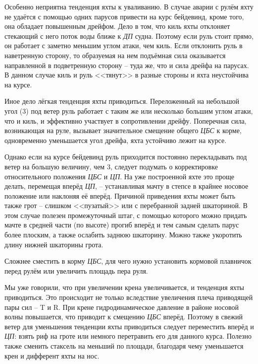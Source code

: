 Особенно неприятна тенденция яхты к уваливанию. В случае аварии с
рулём яхту не удаётся с помощью одних парусов привести на курс
бейдевинд, кроме того, она обладает повышенным дрейфом. Дело в том,
что киль яхты отклоняет стекающий с него поток воды ближе к
\textit{ДП} судна. Поэтому если руль стоит прямо, он работает с
заметно меньшим углом атаки, чем киль. Если отклонить руль в
наветренную сторону, то образуемая на нем подъёмная сила оказывается
направленной в подветренную сторону \--- туда же, что и сила дрейфа на
парусах. В данном случае киль и руль <<тянут>> в разные стороны и яхта
неустойчива на курсе.

Иное дело лёгкая тенденция яхты приводиться. Переложенный на небольшой
угол (3\gr) под ветер руль работает с таким же или несколько
большим углом атаки, что и киль, и эффективно участвует в
сопротивлении дрейфу. Поперечная сила, возникающая на руле, вызывает
значительное смещение общего \textit{ЦБС} к корме, одновременно
уменьшается угол дрейфа, яхта устойчиво лежит на курсе.

Однако если на курсе бейдевинд руль приходится постоянно перекладывать
под ветер на большую величину, чем 3\gr, следует подумать о
корректировке относительного положения \textit{ЦБС} и \textit{ЦП}. На
уже построенной яхте это проще делать, перемещая вперёд \textit{ЦП},
\--- устанавливая мачту в степсе в крайнее носовое положение или
наклоняя её вперёд. Причиной приведения яхты может быть также грот
\--- слишком <<пузатый>> или с перебранной задней шкаториной. В этом
случае полезен промежуточный штаг, с помощью которого можно придать
мачте в средней части (по высоте) прогиб вперёд и тем самым сделать
парус более плоским, а также ослабить заднюю шкаторину. Можно также
укоротить длину нижней шкаторины грота.

Сложнее сместить в корму \textit{ЦБС}, для чего нужно установить
кормовой плавничок перед рулём или увеличить площадь пера руля.

Мы уже говорили, что при увеличении крена увеличивается, и тенденция
яхты приводиться. Это происходит не только вследствие увеличения плеча
приводящей пары сил \--- \ve T и \ve R. При крене гидродинамическое
давление в районе носовой волны повышается, что приводит к смещению
\textit{ЦБС} вперёд. Поэтому в свежий ветер для уменьшения тенденции
яхты приводиться следует переместить вперёд и \textit{ЦП}: взять риф
на гроте или немного перетравить его для данного курса. Полезно также
сменить стаксель на меньший по площади, благодаря чему уменьшается
крен и дифферент яхты на нос.

